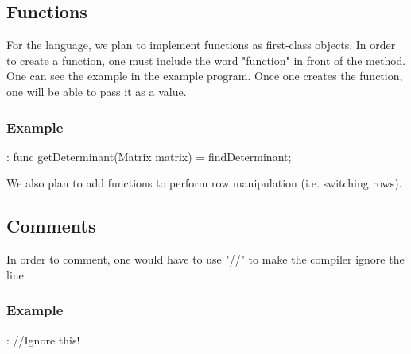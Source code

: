 \documentclass[12pt]{article}
\begin{document}
\subsection{Functions}
For the language, we plan to implement functions as first-class objects. In order to create a function, one must include the word "function" in front of the method. One can see the example in the example program. Once one creates the function, one will be able to pass it as a value.
\subsubsection{Example}
{: func getDeterminant(Matrix matrix) = findDeterminant;
}

\medbreak
We also plan to add functions to perform row manipulation (i.e. switching rows).

\subsection{Comments}
In order to comment, one would have to use "//" to make the compiler ignore the line.
\subsubsection{Example}
{: //Ignore this!
}
\end{document}
